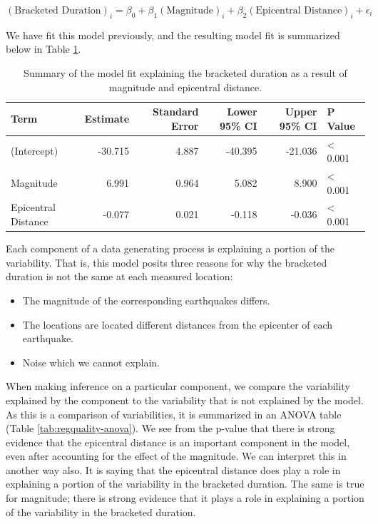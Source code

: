 \documentclass[]{book}
\providecommand{\tightlist}{%
  \setlength{\itemsep}{0pt}\setlength{\parskip}{0pt}}
\theoremstyle{definition}
\theoremstyle{definition}
\theoremstyle{definition}
\theoremstyle{remark}
\begin{document}
\[(\text{Bracketed Duration})_i = \beta_0 + \beta_1(\text{Magnitude})_i + \beta_2(\text{Epicentral Distance})_i + \epsilon_i\]

We have fit this model previously, and the resulting model fit is
summarized below in Table \ref{tab:regquality-fit}.

\begin{table}

\caption{\label{tab:regquality-fit}Summary of the model fit explaining the bracketed duration as a result of magnitude and epicentral distance.}
\centering
\begin{tabular}[t]{l|r|r|r|r|l}
\hline
Term & Estimate & Standard Error & Lower 95\% CI & Upper 95\% CI & P Value\\
\hline
(Intercept) & -30.715 & 4.887 & -40.395 & -21.036 & < 0.001\\
\hline
Magnitude & 6.991 & 0.964 & 5.082 & 8.900 & < 0.001\\
\hline
Epicentral Distance & -0.077 & 0.021 & -0.118 & -0.036 & < 0.001\\
\hline
\end{tabular}
\end{table}

Each component of a data generating process is explaining a portion of
the variability. That is, this model posits three reasons for why the
bracketed duration is not the same at each measured location:

\begin{itemize}
\tightlist
\item
  The magnitude of the corresponding earthquakes differs.
\item
  The locations are located different distances from the epicenter of
  each earthquake.
\item
  Noise which we cannot explain.
\end{itemize}

When making inference on a particular component, we compare the
variability explained by the component to the variability that is not
explained by the model. As this is a comparison of variabilities, it is
summarized in an ANOVA table (Table \ref{tab:regquality-anova}). We see
from the p-value that there is strong evidence that the epicentral
distance is an important component in the model, even after accounting
for the effect of the magnitude. We can interpret this in another way
also. It is saying that the epicentral distance does play a role in
explaining a portion of the variability in the bracketed duration. The
same is true for magnitude; there is strong evidence that it plays a
role in explaining a portion of the variability in the bracketed
duration.
\end{document}
